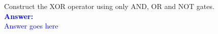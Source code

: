 \item{}
Construct the XOR operator using only AND, OR and NOT gates.\\[12pt]
\ifanswers
\textcolor{blue}{
\textbf{Answer:}\\[12pt]
Answer goes here
}
\newpage
\fi
